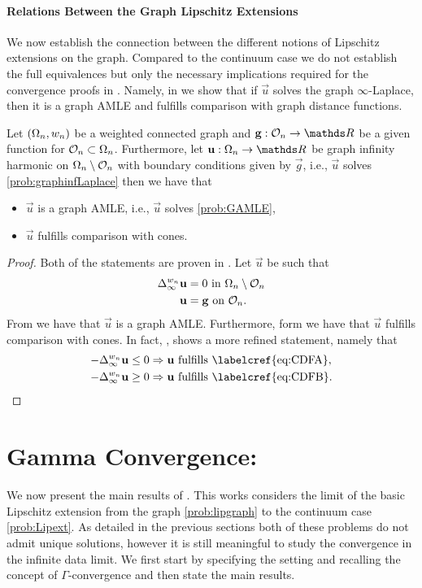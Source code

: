\paragraph{Relations Between the Graph Lipschitz Extensions} We now establish the connection between the different notions of Lipschitz extensions on the graph. Compared to the continuum case we do not establish the full equivalences but only the necessary implications required for the convergence proofs in \cite{bungert2021uniform}. Namely, in \cite{bungert2021uniform} we show that if $\vec u$ solves the graph $\infty$-Laplace, then it is a graph AMLE and fulfills comparison with graph distance functions. 
%
%
\begin{lemma}{\cite[Th. 3.2, Prop. 3.8]{bungert2021uniform}}{}
Let $(\Omega_n,w_n)$ be a weighted connected graph and $\vec g:\conset_n\to\R$ be a given function for $\mathcal{O}_n\subset\Omega_n$. Furthermore, let $\vec u:\domain_n\to\R$ be graph infinity harmonic on $\Omega_n\setminus\mathcal{O}_n$ with boundary conditions given by $\vec g$, i.e., $\vec u$ solves \cref{prob:graphinfLaplace} then we have that
%
\begin{itemize}
\item $\vec u$ is a graph AMLE, i.e., $\vec u$ solves \cref{prob:GAMLE},
\item $\vec u$ fulfills comparison with cones.
\end{itemize}
\end{lemma}
%
%
\begin{proof}
Both of the statements are proven in \cite{bungert2021uniform}. Let $\vec u$ be such that 
%
\begin{align*}
\Delta^{w_n}_\infty \mathbf{u} &= 0\text{ in }\Omega_n \setminus \mathcal{O}_n\\
\mathbf{u} &= \mathbf{g} \text{ on } \mathcal{O}_n.
\end{align*}
%
From \cite[Prop. 3.8]{bungert2021uniform} we have that $\vec u$ is a graph AMLE. Furthermore, form \cite[Th. 3.2]{bungert2021uniform} we have that $\vec u$ fulfills comparison with cones. In fact, \cite[Th. 3.2]{bungert2021uniform}, shows a more refined statement, namely that
%
\begin{align*}
-\Delta^{w_n}_\infty \vec u &\leq 0 \Rightarrow \vec u \text{ fulfills \labelcref{eq:CDFA}},\\
-\Delta^{w_n}_\infty \vec u &\geq 0 \Rightarrow \vec u \text{ fulfills \labelcref{eq:CDFB}}.
\end{align*}
%
\end{proof}
%
%
%
%
\section{Gamma Convergence: \cite{roith2022continuum}}\label{sec:GConv}
We now present the main results of \cite{roith2022continuum}. This works considers the limit of the basic Lipschitz extension from the graph \cref{prob:lipgraph} to the continuum case \cref{prob:Lipext}. As detailed in the previous sections both of these problems do not admit unique solutions, however it is still meaningful to study the convergence in the infinite data limit. We first start by specifying the setting and recalling the concept of $\Gamma$-convergence and then state the main results.
%
%
